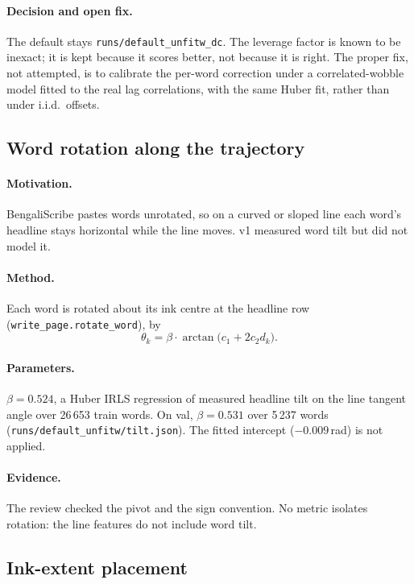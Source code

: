 \documentclass[11pt,a4paper]{article}
\newcommand{\src}[1]{{\footnotesize\texttt{#1}}}
\begin{document}
\paragraph{Decision and open fix.} The default stays
\texttt{runs/default\_unfitw\_dc}. The leverage factor is known to be
inexact; it is kept because it scores better, not because it is right. The
proper fix, not attempted, is to calibrate the per-word correction under a
correlated-wobble model fitted to the real lag correlations, with the same
Huber fit, rather than under i.i.d.\ offsets.

\subsection{Word rotation along the trajectory}
\label{sec:tilt}
\paragraph{Motivation.} BengaliScribe pastes words unrotated, so on a curved or
sloped line each word's headline stays horizontal while the line moves. v1
measured word tilt but did not model it.

\paragraph{Method.} Each word is rotated about its ink centre at the headline
row (\texttt{write\_page.rotate\_word}), by
\begin{equation}
\theta_k=\beta\cdot\arctan\!\big(c_1+2c_2 d_k\big).
\end{equation}

\paragraph{Parameters.} $\beta=0.524$, a Huber IRLS regression of measured
headline tilt on the line tangent angle over 26\,653 train words. On val,
$\beta=0.531$ over 5\,237 words (\src{runs/default\_unfitw/tilt.json}). The
fitted intercept ($-0.009$\,rad) is not applied.

\paragraph{Evidence.} The review checked the pivot and the sign convention. No
metric isolates rotation: the line features do not include word tilt.

\subsection{Ink-extent placement}
\label{sec:ink}
\end{document}
